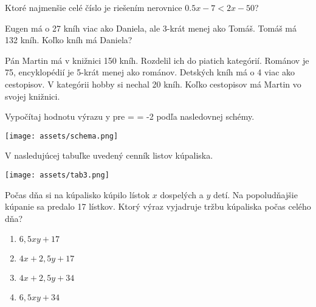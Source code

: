 \begin{example}
	Ktoré najmenšie celé číslo je riešením nerovnice $0.5x - 7 < 2x - 50$?
\end{example}

\begin{example}
	Eugen má o 27 kníh viac ako Daniela, ale 3-krát menej ako Tomáš. Tomáš má 132 kníh. Koľko kníh má Daniela?
\end{example}

\begin{example}
	Pán Martin má v knižnici 150 kníh. Rozdelil ich do piatich kategórií. Románov je 75, encyklopédií je 5-krát menej ako románov. Detských kníh má o 4 viac ako cestopisov. V kategórii hobby si nechal 20 kníh. Koľko cestopisov má Martin vo svojej knižnici.
\end{example}

\begin{example}
	Vypočítaj hodnotu výrazu y pre = = -2 podľa nasledovnej schémy.
	
	\begin{center}
		\texttt{[image: assets/schema.png]}
	\end{center}
\end{example}

\begin{example}
	V nasledujúcej tabuľke uvedený cenník listov kúpaliska.
	
	\begin{center}
		\texttt{[image: assets/tab3.png]}
	\end{center}
	
	Počas dňa si na kúpalisko kúpilo lístok $x$ dospelých a $y$ detí. Na popoludňajšie kúpanie sa predalo 17 lístkov. Ktorý výraz vyjadruje tržbu kúpaliska počas celého dňa?
	
	\begin{enumerate}
		\item $6,5xy + 17$
		\item $4x + 2,5y + 17$
		\item $4x + 2,5y + 34$
		\item $6,5xy + 34$
	\end{enumerate}
\end{example}